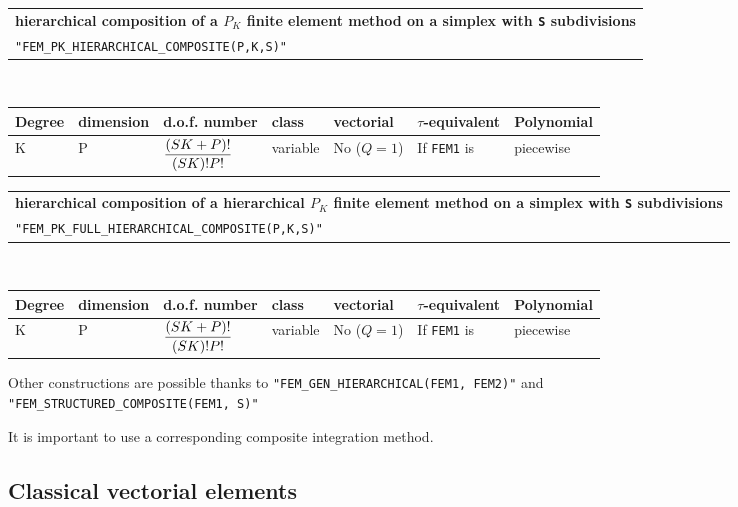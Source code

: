 \documentclass[10pt,a4paper]{article}
\begin{document}
\begin{center}
\begin{tabular}{|m{16.109cm}|} \hline 
{\bf hierarchical composition of a $P_K$ finite element method on a simplex with {\tt S} subdivisions}\\
{\tt "FEM\_PK\_HIERARCHICAL\_COMPOSITE(P,K,S)"} 
\end{tabular} \\ \vspace{-1pt} 
\begin{tabular}{|m{2cm}|m{2cm}|m{2.5cm}|m{1.5cm}|m{1.5cm}|m{2cm}|m{2cm}|} \hline 
Degree & dimension & d.o.f. number & class & vectorial & \mbox{$\tau$-equivalent} & Polynomial\\ \hline
\small K & \small P & \mbox{${\displaystyle \frac{\displaystyle (SK+P)!}{\displaystyle (SK)! P!}}$} & variable & No \mbox{($Q = 1$)} & If {\tt FEM1} is  & piecewise\\ \hline
\end{tabular}
\end{center}

\begin{center}
\begin{tabular}{|m{16.109cm}|} \hline 
{\bf hierarchical composition of a hierarchical $P_K$ finite element method on a simplex with {\tt S} subdivisions}\\
{\tt "FEM\_PK\_FULL\_HIERARCHICAL\_COMPOSITE(P,K,S)"} 
\end{tabular} \\ \vspace{-1pt} 
\begin{tabular}{|m{2cm}|m{2cm}|m{2.5cm}|m{1.5cm}|m{1.5cm}|m{2cm}|m{2cm}|} \hline 
Degree & dimension & d.o.f. number & class & vectorial & \mbox{$\tau$-equivalent} & Polynomial\\ \hline
\small K & \small P & \mbox{${\displaystyle \frac{\displaystyle (SK+P)!}{\displaystyle (SK)! P!}}$} & variable & No \mbox{($Q = 1$)} & If {\tt FEM1} is  & piecewise\\ \hline
\end{tabular}
\end{center}

Other constructions are possible thanks to {\tt "FEM\_GEN\_HIERARCHICAL(FEM1, FEM2)"} and \\ {\tt "FEM\_STRUCTURED\_COMPOSITE(FEM1, S)"}

It is important to use a corresponding composite integration method.


\subsection{Classical vectorial elements}
\end{document}
